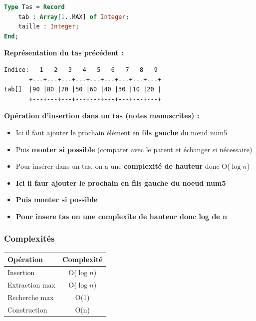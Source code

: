 \documentclass[12pt,a4paper]{article}
\begin{document}
\begin{lstlisting}[language=Pascal]
Type Tas = Record
    tab : Array[1..MAX] of Integer;
    taille : Integer;
End;
\end{lstlisting}

\begin{exemple}
\textbf{Représentation du tas précédent :}
\begin{verbatim}
Indice:   1   2   3   4   5   6   7   8   9
       +---+---+---+---+---+---+---+---+---+
tab[]  |90 |80 |70 |50 |60 |40 |30 |10 |20 |
       +---+---+---+---+---+---+---+---+---+
\end{verbatim}
\end{exemple}

\begin{notecours}
\textbf{Opération d'insertion dans un tas (notes manuscrites) :}
\begin{itemize}
    \item Ici il faut ajouter le prochain élément en \textbf{fils gauche} du nœud num5
    \item Puis \textbf{monter si possible} (comparer avec le parent et échanger si nécessaire)
    \item Pour insérer dans un tas, on a une \textbf{complexité de hauteur} donc O($\log n$)
    \item \textbf{Ici il faur ajouter le prochain en fils gauche du noeud num5}
    \item \textbf{Puis monter si possible}
    \item \textbf{Pour insere tas on une complexite de hauteur donc log de n}
\end{itemize}
\end{notecours}

\subsubsection{Complexités}

\begin{center}
\colorbox{fondvert!20}{
\begin{tabular}{|l|c|}
\hline
\rowcolor{defvert!30}
\textbf{Opération} & \textbf{Complexité} \\
\hline
Insertion & \textcolor{algoviolet}{O($\log n$)} \\
Extraction max & \textcolor{algoviolet}{O($\log n$)} \\
Recherche max & \textcolor{defvert}{O(1)} \\
Construction & \textcolor{defvert}{O(n)} \\
\hline
\end{tabular}}
\end{center}
\end{document}
